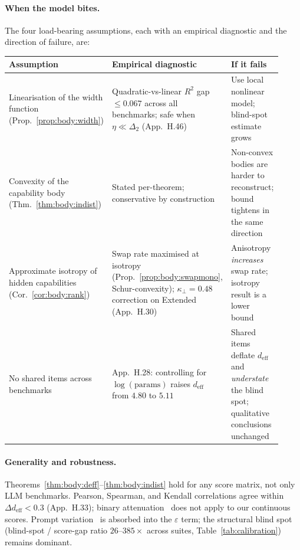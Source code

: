 \documentclass{article}
\begin{document}
\paragraph{When the model bites.} The four load-bearing assumptions,
each with an empirical diagnostic and the direction of failure, are:

\begin{table}[h]
\small\centering
\renewcommand{\arraystretch}{1.15}
\begin{tabular}{p{0.23\linewidth} p{0.37\linewidth} p{0.32\linewidth}}
\toprule
\textbf{Assumption} & \textbf{Empirical diagnostic} &
\textbf{If it fails} \\
\midrule
Linearisation of the width function
  (Prop.~\ref{prop:body:width})
  & Quadratic-vs-linear $R^2$ gap $\le 0.067$ across all benchmarks;
    safe when $\eta \ll \Delta_2$ (App.~H.46)
  & Use local nonlinear model; blind-spot estimate grows \\
Convexity of the capability body
  (Thm.~\ref{thm:body:indist})
  & Stated per-theorem; conservative by construction
  & Non-convex bodies are harder to reconstruct; bound tightens in
    the same direction \\
Approximate isotropy of hidden capabilities
  (Cor.~\ref{cor:body:rank})
  & Swap rate maximised at isotropy
    (Prop.~\ref{prop:body:swapmono}, Schur-convexity);
    $\kappa_\perp = 0.48$ correction on Extended (App.~H.30)
  & Anisotropy \emph{increases} swap rate; isotropy result is a
    lower bound \\
No shared items across benchmarks
  & App.~H.28: controlling for $\log(\mathrm{params})$ raises
    $d_{\mathrm{eff}}$ from $4.80$ to $5.11$
  & Shared items deflate $d_{\mathrm{eff}}$ and \emph{understate}
    the blind spot; qualitative conclusions unchanged \\
\bottomrule
\end{tabular}
\end{table}

\paragraph{Generality and robustness.}
Theorems~\ref{thm:body:deff}--\ref{thm:body:indist} hold for any
score matrix, not only LLM benchmarks. Pearson, Spearman, and
Kendall correlations agree within $\Delta d_{\mathrm{eff}} < 0.3$
(App.~H.33); binary attenuation~\citep{shazhao2026benchscope}
does not apply to our continuous scores. Prompt
variation~\citep{pashkovich2024efficient} is absorbed into the
$\varepsilon$ term; the structural blind spot (blind-spot /
score-gap ratio $26$--$385\times$ across suites,
Table~\ref{tab:calibration}) remains dominant.
\end{document}
